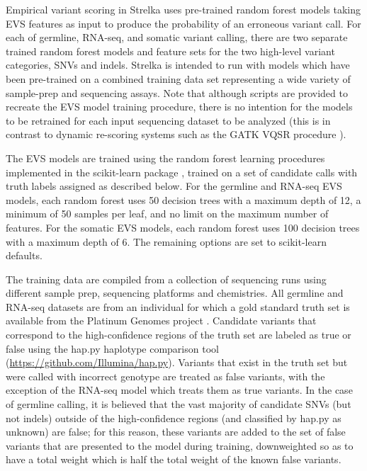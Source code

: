 \documentclass{article}
\begin{document}
Empirical variant scoring in Strelka uses pre-trained random forest models taking EVS features as input to produce the probability of an erroneous variant call. For each of germline, RNA-seq, and somatic variant calling, there are two separate trained random forest models and feature sets for the two high-level variant categories, SNVs and indels. Strelka is intended to run with models which have been pre-trained on a combined training data set representing a wide variety of sample-prep and sequencing assays. Note that although scripts are provided to recreate the EVS model training procedure, there is no intention for the models to be retrained for each input sequencing dataset to be analyzed (this is in contrast to dynamic re-scoring systems such as the GATK VQSR procedure \cite{depristo2011}).

The EVS models are trained using the random forest learning procedures implemented in the scikit-learn package \cite{scikit-learn}, trained on a set of candidate calls with truth labels assigned as described below. For the germline and RNA-seq EVS models, each random forest uses 50 decision trees with a maximum depth of 12, a minimum of 50 samples per leaf, and no limit on the maximum number of features. For the somatic EVS models, each random forest uses 100 decision trees with a maximum depth of 6. The remaining options are set to scikit-learn defaults.

The training data are compiled from a collection of sequencing runs using different sample prep, sequencing platforms and chemistries. All germline and RNA-seq datasets are from an individual for which a gold standard truth set is available from the Platinum Genomes project \cite{eberle2017}. Candidate variants that correspond to the high-confidence regions of the truth set are labeled as true or false using the hap.py haplotype comparison tool (\url{https://github.com/Illumina/hap.py}). Variants that exist in the truth set but were called with incorrect genotype are treated as false variants, with the exception of the RNA-seq model which treats them as true variants. In the case of germline calling, it is believed that the vast majority of candidate SNVs (but not indels) outside of the high-confidence regions (and classified by hap.py as unknown) are false; for this reason, these variants are added to the set of false variants that are presented to the model during training, downweighted so as to have a total weight which is half the total weight of the known false variants.
\end{document}
